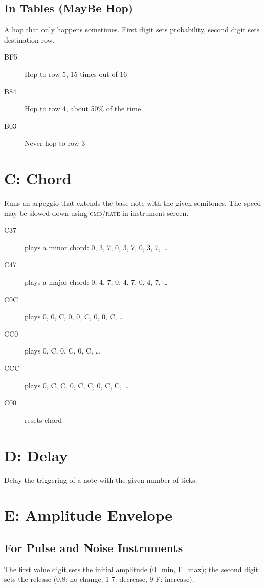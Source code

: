 \subsection{In Tables (MayBe Hop)}

A hop that only happens sometimes.
First digit sets probability, second digit
sets destination row.

\begin{description}
    \item[BF5] Hop to row 5, 15 times out of 16
    \item[B84] Hop to row 4, about 50\% of the time
    \item[B03] Never hop to row 3
\end{description}

\section{C: Chord}

\label{command-chord}
Runs an arpeggio that extends the base note with the given semitones. The speed may be slowed down using \textsc{cmd/rate} in instrument screen.

\begin{description}
\item[C37] plays a minor chord: 0, 3, 7, 0, 3, 7, 0, 3, 7, \ldots
\item[C47] plays a major chord: 0, 4, 7, 0, 4, 7, 0, 4, 7, \ldots
\item[C0C] plays 0, 0, C, 0, 0, C, 0, 0, C, \ldots
\item[CC0] plays 0, C, 0, C, 0, C, \ldots
\item[CCC] plays 0, C, C, 0, C, C, 0, C, C, \ldots
\item[C00] resets chord
\end{description}

\section{D: Delay}

Delay the triggering of a note with the given number of ticks.

\section{E: Amplitude Envelope}

\subsection{For Pulse and Noise Instruments}
The first value digit sets the initial amplitude (0=min, F=max); the second digit sets the release (0,8: no change, 1-7: decrease, 9-F: increase).

